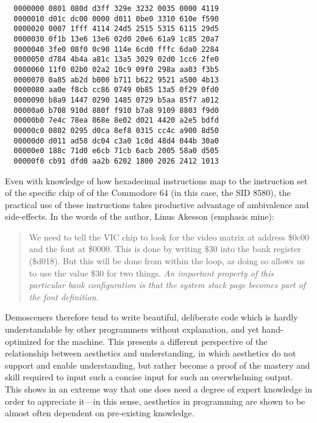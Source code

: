 \documentclass{article}
\begin{document}
\begin{lstlisting}
  0000000 0801 080d d3ff 329e 3232 0035 0000 4119
  0000010 d01c dc00 0000 d011 0be0 3310 610e f590
  0000020 0007 1fff 4114 24d5 2515 5315 6115 29d5
  0000030 0f1b 13e6 13e6 02d0 20e6 61a9 1c85 20a7
  0000040 3fe0 08f0 0c90 114e 6cd0 fffc 6da0 2284
  0000050 d784 4b4a a81c 13a5 3029 02d0 1cc6 2fe0
  0000060 11f0 02b0 02a2 10c9 09f0 298a aa03 f3b5
  0000070 0a85 ab2d b000 b711 b622 9521 a500 4b13
  0000080 aa0e f8cb cc86 0749 0b85 13a5 0f29 0fd0
  0000090 b8a9 1447 0290 1485 0729 b5aa 85f7 a012
  00000a0 b708 910d 880f f910 b7a8 9109 8803 f9d0
  00000b0 7e4c 78ea 868e 8e02 d021 4420 a2e5 bdfd
  00000c0 0802 0295 d0ca 8ef8 0315 cc4c a900 8d50
  00000d0 d011 ad58 dc04 c3a0 1c0d 48d4 044b 30a0
  00000e0 188c 71d0 e6cb 71cb 6acb 2005 58a0 d505
  00000f0 cb91 dfd0 aa2b 6202 1800 2026 2412 1013
\end{lstlisting}

Even with knowledge of how hexadecimal instructions map to the instruction set of the specific chip of of the Commodore 64 (in this case, the SID 8580), the practical use of these instructions takes productive advantage of ambivalence and side-effects. In the words of the author, Linus Akesson (emphasis mine):

\begin{quote}
  We need to tell the VIC chip to look for the video matrix at address \$0c00 and the font at \$0000. This is done by writing \$30 into the bank register (\$d018). But this will be done from within the loop, as doing so allows us to use the value \$30 for two things. \emph{An important property of this particular bank configuration is that the system stack page becomes part of the font definition}.
\end{quote}

Demosceners therefore tend to write beautiful, deliberate code which is hardly understandable by other programmers without explanation, and yet hand-optimized for the machine. This presents a different perspective of the relationship between aesthetics and understanding, in which aesthetics do not support and enable understanding, but rather become a proof of the mastery and skill required to input such a concise input for such an overwhelming output. This shows in an extreme way that one does need a degree of expert knowledge in order to appreciate it—in this sense, aesthetics in programming are shown to be almost often dependent on pre-existing knowledge.

\vspace{1\baselineskip}
\end{document}

